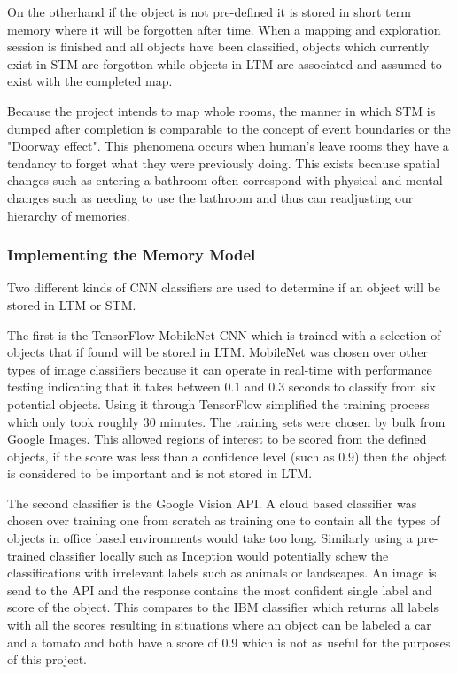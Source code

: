 \documentclass{mproj}
\begin{document}
On the otherhand if the object is not pre-defined it is stored in short term memory where it will be forgotten after time. When a mapping and exploration session is finished and all objects have been classified, objects which currently exist in STM are forgotton while objects in LTM are associated and assumed to exist with the completed map.

Because the project intends to map whole rooms, the manner in which STM is dumped after completion is comparable to the concept of event boundaries or the "Doorway effect". \cite{} This phenomena occurs when human's leave rooms they have a tendancy to forget what they were previously doing. This exists because spatial changes such as entering a bathroom often correspond with physical and mental changes such as needing to use the bathroom and thus can readjusting our hierarchy of memories.

\subsubsection{Implementing the Memory Model}

Two different kinds of CNN classifiers are used to determine if an object will be stored in LTM or STM. 

The first is the TensorFlow MobileNet CNN which is trained with a selection of objects that if found will be stored in LTM. MobileNet was chosen over other types of image classifiers because it can operate in real-time with performance testing indicating that it takes between 0.1 and 0.3 seconds to classify from six potential objects. Using it through TensorFlow simplified the training process which only took roughly 30 minutes. The training sets were chosen by bulk from Google Images. This allowed regions of interest to be scored from the defined objects, if the score was less than a confidence level (such as 0.9) then the object is considered to be important and is not stored in LTM.

The second classifier is the Google Vision API. A cloud based classifier was chosen over training one from scratch as training one to contain all the types of objects in office based environments would take too long. Similarly using a pre-trained classifier locally such as Inception \cite{} would potentially schew the classifications with irrelevant labels such as animals or landscapes. An image is send to the API and the response contains the most confident single label and score of the object. This compares to the IBM classifier which returns all labels with all the scores resulting in situations where an object can be labeled a car and a tomato and both have a score of 0.9 which is not as useful for the purposes of this project. 
\end{document}
